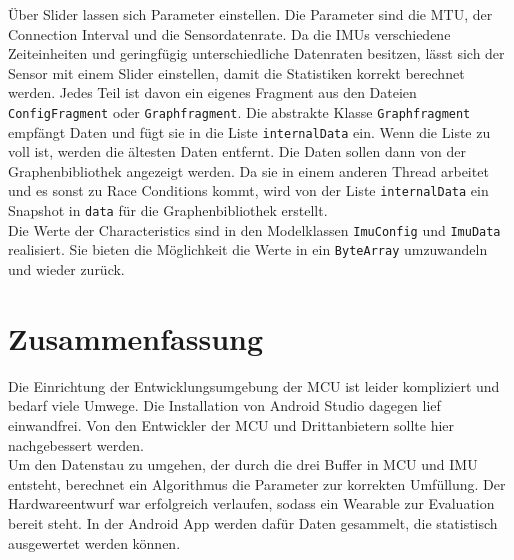 Über Slider lassen sich Parameter einstellen.
Die Parameter sind die MTU, der Connection Interval und die Sensordatenrate.
Da die IMUs verschiedene Zeiteinheiten und geringfügig unterschiedliche Datenraten besitzen, lässt sich der Sensor mit einem Slider einstellen, damit die Statistiken korrekt berechnet werden.
Jedes Teil ist davon ein eigenes Fragment aus den Dateien \texttt{ConfigFragment} oder \texttt{Graphfragment}.
Die abstrakte Klasse \texttt{Graphfragment} empfängt Daten und fügt sie in die Liste \texttt{internalData} ein.
Wenn die Liste zu voll ist, werden die ältesten Daten entfernt.
Die Daten sollen dann von der Graphenbibliothek angezeigt werden.
Da sie in einem anderen Thread arbeitet und es sonst zu Race Conditions kommt, wird von der Liste \texttt{internalData} ein Snapshot in \texttt{data} für die Graphenbibliothek erstellt.\\
Die Werte der Characteristics sind in den Modelklassen \texttt{ImuConfig} und \texttt{ImuData} realisiert.
Sie bieten die Möglichkeit die Werte in ein \texttt{ByteArray} umzuwandeln und wieder zurück.

\section{Zusammenfassung}
Die Einrichtung der Entwicklungsumgebung der MCU ist leider kompliziert und bedarf viele Umwege.
Die Installation von Android Studio dagegen lief einwandfrei.
Von den Entwickler der MCU und Drittanbietern sollte hier nachgebessert werden.\\
Um den Datenstau zu umgehen, der durch die drei Buffer in MCU und IMU entsteht, berechnet ein Algorithmus die Parameter zur korrekten Umfüllung.
Der Hardwareentwurf war erfolgreich verlaufen, sodass ein Wearable zur Evaluation bereit steht.
In der Android App werden dafür Daten gesammelt, die statistisch ausgewertet werden können.
